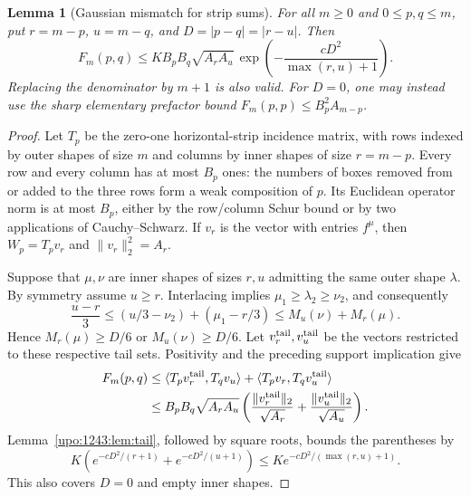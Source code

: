 \documentclass[11pt,letterpaper]{article}
\newtheorem{lemma}[theorem]{Lemma}
\theoremstyle{remark}\newtheorem{remark}[theorem]{Remark}
\numberwithin{equation}{section}
\begin{document}
\begin{lemma}[Gaussian mismatch for strip sums]\label{upo:1243:lem:mismatch}
For all $m\ge0$ and $0\le p,q\le m$, put
$r=m-p$, $u=m-q$, and $D=|p-q|=|r-u|$. Then
\begin{equation}\label{upo:1243:eq:mismatch}
 F_m(p,q)\le
 K B_pB_q\sqrt{A_rA_u}\,
 \exp\left(-\frac{cD^2}{\max(r,u)+1}\right).
\end{equation}
Replacing the denominator by $m+1$ is also valid. For $D=0$, one may
instead use the sharp elementary prefactor bound
$F_m(p,p)\le B_p^2A_{m-p}$.
\end{lemma}
\begin{proof}
Let $T_p$ be the zero-one horizontal-strip incidence matrix, with rows
indexed by outer shapes of size $m$ and columns by inner shapes of size
$r=m-p$. Every row and every column has at most $B_p$ ones: the numbers
of boxes removed from or added to the three rows form a weak composition
of $p$. Its Euclidean operator norm is at most $B_p$, either by the
row/column Schur bound or by two applications of Cauchy--Schwarz.
If $v_r$ is the vector with entries $f^\mu$, then
$W_p=T_pv_r$ and $\|v_r\|_2^2=A_r$.

Suppose that $\mu,\nu$ are inner shapes of sizes $r,u$ admitting the same
outer shape $\lambda$. By symmetry assume $u\ge r$. Interlacing implies
$\mu_1\ge\lambda_2\ge\nu_2$, and consequently
\[
 \frac{u-r}{3}
 \le (u/3-\nu_2)+(\mu_1-r/3)
 \le M_u(\nu)+M_r(\mu).
\]
Hence $M_r(\mu)\ge D/6$ or $M_u(\nu)\ge D/6$.
Let $v_r^{\rm tail},v_u^{\rm tail}$ be the vectors restricted to these
respective tail sets. Positivity and the preceding support implication give
\begin{align*}
 F_m(p,q)
 &\le \langle T_pv_r^{\rm tail},T_qv_u\rangle
       +\langle T_pv_r,T_qv_u^{\rm tail}\rangle\\
 &\le B_pB_q\sqrt{A_rA_u}
 \left(\frac{\|v_r^{\rm tail}\|_2}{\sqrt{A_r}}
       +\frac{\|v_u^{\rm tail}\|_2}{\sqrt{A_u}}\right).
\end{align*}
Lemma~\ref{upo:1243:lem:tail}, followed by square roots, bounds the parentheses by
\[
 K\left(e^{-cD^2/(r+1)}+e^{-cD^2/(u+1)}\right)
 \le K e^{-cD^2/(\max(r,u)+1)}.
\]
This also covers $D=0$ and empty inner shapes.
\end{proof}
\end{document}

